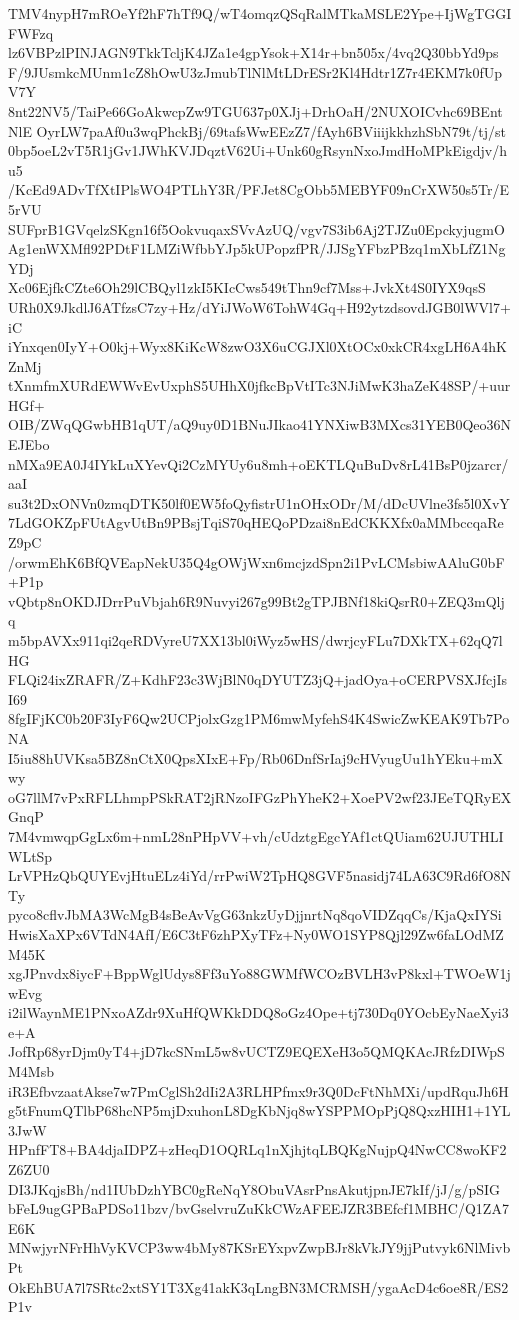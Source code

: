 TMV4nypH7mROeYf2hF7hTf9Q/wT4omqzQSqRalMTkaMSLE2Ype+IjWgTGGIFWFzq
lz6VBPzlPINJAGN9TkkTcljK4JZa1e4gpYsok+X14r+bn505x/4vq2Q30bbYd9ps
F/9JUsmkcMUnm1cZ8hOwU3zJmubTlNlMtLDrESr2Kl4Hdtr1Z7r4EKM7k0fUpV7Y
8nt22NV5/TaiPe66GoAkwcpZw9TGU637p0XJj+DrhOaH/2NUXOICvhc69BEntNlE
OyrLW7paAf0u3wqPhckBj/69tafsWwEEzZ7/fAyh6BViiijkkhzhSbN79t/tj/st
0bp5oeL2vT5R1jGv1JWhKVJDqztV62Ui+Unk60gRsynNxoJmdHoMPkEigdjv/hu5
/KcEd9ADvTfXtIPlsWO4PTLhY3R/PFJet8CgObb5MEBYF09nCrXW50s5Tr/E5rVU
SUFprB1GVqelzSKgn16f5OokvuqaxSVvAzUQ/vgv7S3ib6Aj2TJZu0EpckyjugmO
Ag1enWXMfl92PDtF1LMZiWfbbYJp5kUPopzfPR/JJSgYFbzPBzq1mXbLfZ1NgYDj
Xc06EjfkCZte6Oh29lCBQyl1zkI5KIcCws549tThn9cf7Mss+JvkXt4S0IYX9qsS
URh0X9JkdlJ6ATfzsC7zy+Hz/dYiJWoW6TohW4Gq+H92ytzdsovdJGB0lWVl7+iC
iYnxqen0IyY+O0kj+Wyx8KiKcW8zwO3X6uCGJXl0XtOCx0xkCR4xgLH6A4hKZnMj
tXnmfmXURdEWWvEvUxphS5UHhX0jfkcBpVtITc3NJiMwK3haZeK48SP/+uurHGf+
OIB/ZWqQGwbHB1qUT/aQ9uy0D1BNuJIkao41YNXiwB3MXcs31YEB0Qeo36NEJEbo
nMXa9EA0J4IYkLuXYevQi2CzMYUy6u8mh+oEKTLQuBuDv8rL41BsP0jzarcr/aaI
su3t2DxONVn0zmqDTK50lf0EW5foQyfistrU1nOHxODr/M/dDcUVlne3fs5l0XvY
7LdGOKZpFUtAgvUtBn9PBsjTqiS70qHEQoPDzai8nEdCKKXfx0aMMbccqaReZ9pC
/orwmEhK6BfQVEapNekU35Q4gOWjWxn6mcjzdSpn2i1PvLCMsbiwAAluG0bF+P1p
vQbtp8nOKDJDrrPuVbjah6R9Nuvyi267g99Bt2gTPJBNf18kiQsrR0+ZEQ3mQljq
m5bpAVXx911qi2qeRDVyreU7XX13bl0iWyz5wHS/dwrjcyFLu7DXkTX+62qQ7lHG
FLQi24ixZRAFR/Z+KdhF23c3WjBlN0qDYUTZ3jQ+jadOya+oCERPVSXJfcjIsI69
8fgIFjKC0b20F3IyF6Qw2UCPjolxGzg1PM6mwMyfehS4K4SwicZwKEAK9Tb7PoNA
I5iu88hUVKsa5BZ8nCtX0QpsXIxE+Fp/Rb06DnfSrIaj9cHVyugUu1hYEku+mXwy
oG7llM7vPxRFLLhmpPSkRAT2jRNzoIFGzPhYheK2+XoePV2wf23JEeTQRyEXGnqP
7M4vmwqpGgLx6m+nmL28nPHpVV+vh/cUdztgEgcYAf1ctQUiam62UJUTHLIWLtSp
LrVPHzQbQUYEvjHtuELz4iYd/rrPwiW2TpHQ8GVF5nasidj74LA63C9Rd6fO8NTy
pyco8cflvJbMA3WcMgB4sBeAvVgG63nkzUyDjjnrtNq8qoVIDZqqCs/KjaQxIYSi
HwisXaXPx6VTdN4AfI/E6C3tF6zhPXyTFz+Ny0WO1SYP8Qjl29Zw6faLOdMZM45K
xgJPnvdx8iycF+BppWglUdys8Ff3uYo88GWMfWCOzBVLH3vP8kxl+TWOeW1jwEvg
i2ilWaynME1PNxoAZdr9XuHfQWKkDDQ8oGz4Ope+tj730Dq0YOcbEyNaeXyi3e+A
JofRp68yrDjm0yT4+jD7kcSNmL5w8vUCTZ9EQEXeH3o5QMQKAcJRfzDIWpSM4Msb
iR3EfbvzaatAkse7w7PmCglSh2dIi2A3RLHPfmx9r3Q0DcFtNhMXi/updRquJh6H
g5tFnumQTlbP68hcNP5mjDxuhonL8DgKbNjq8wYSPPMOpPjQ8QxzHIH1+1YL3JwW
HPnfFT8+BA4djaIDPZ+zHeqD1OQRLq1nXjhjtqLBQKgNujpQ4NwCC8woKF2Z6ZU0
DI3JKqjsBh/nd1IUbDzhYBC0gReNqY8ObuVAsrPnsAkutjpnJE7kIf/jJ/g/pSIG
bFeL9ugGPBaPDSo11bzv/bvGselvruZuKkCWzAFEEJZR3BEfcf1MBHC/Q1ZA7E6K
MNwjyrNFrHhVyKVCP3ww4bMy87KSrEYxpvZwpBJr8kVkJY9jjPutvyk6NlMivbPt
OkEhBUA7l7SRtc2xtSY1T3Xg41akK3qLngBN3MCRMSH/ygaAcD4c6oe8R/ES2P1v
